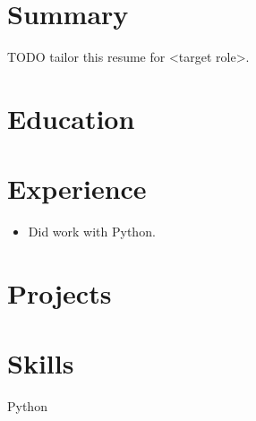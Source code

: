\documentclass[10pt]{article}
\begin{document}
\section*{Summary}
TODO tailor this resume for <target role>.
\section*{Education}

\section*{Experience}
\begin{itemize}\item Did work with Python.\end{itemize}
\section*{Projects}

\section*{Skills}
Python
\end{document}
